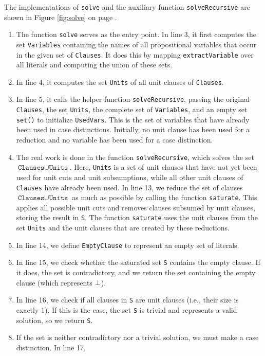 The implementations of \texttt{solve} and the auxiliary function \texttt{solveRecursive} are shown in Figure
\ref{fig:solve} on page \pageref{fig:solve}.
\begin{enumerate}
\item The function \texttt{solve} serves as the entry point. In line 3, it first computes the set
  \texttt{Variables} containing the names of all propositional variables that occur in the given set of
  \texttt{Clauses}. It does this by mapping \texttt{extractVariable} over all literals and computing the union of
  these sets.
\item In line 4, it computes the set \texttt{Units} of all unit clauses of \texttt{Clauses}.
\item In line 5, it calls the helper function \texttt{solveRecursive}, passing the original \texttt{Clauses},
  the set \texttt{Units}, the complete set of \texttt{Variables}, and an empty set \texttt{set()} to initialize
  \texttt{UsedVars}.  This is the set of variables that have already been used in case distinctions.
  Initially, no unit clause has been used for a reduction and no variable has been used for a case
  distinction.
\item The real work is done in the function \texttt{solveRecursive}, which solves the set
  $\texttt{Clauses} \cup \texttt{Units}$.  Here, \texttt{Units} is a set of unit clauses that have not yet
  been used for unit cuts and unit subsumptions, while all other unit clauses of \texttt{Clauses} have already
  been used.  In line 13, we reduce the set of clauses $\texttt{Clauses} \cup \texttt{Units}$ as much as
  possible by calling the function \texttt{saturate}. This applies all possible unit cuts and removes clauses
  subsumed by unit clauses, storing the result in \texttt{S}.  The function \texttt{saturate} uses the unit
  clauses from the set \texttt{Units} and the unit clauses that are created by these reductions.
\item In line 14, we define \texttt{EmptyClause} to represent an empty set of literals.
\item In line 15, we check whether the saturated set \texttt{S} contains the empty clause. If it does, the set
  is contradictory, and we return the set containing the empty clause (which represents $\bot$).
\item In line 16, we check if all clauses in \texttt{S} are unit clauses (i.e., their size is exactly 1). If
  this is the case, the set \texttt{S} is trivial and represents a valid solution, so we return \texttt{S}.
\item If the set is neither contradictory nor a trivial solution, we must make a case distinction. In line 17,

\end{enumerate}
